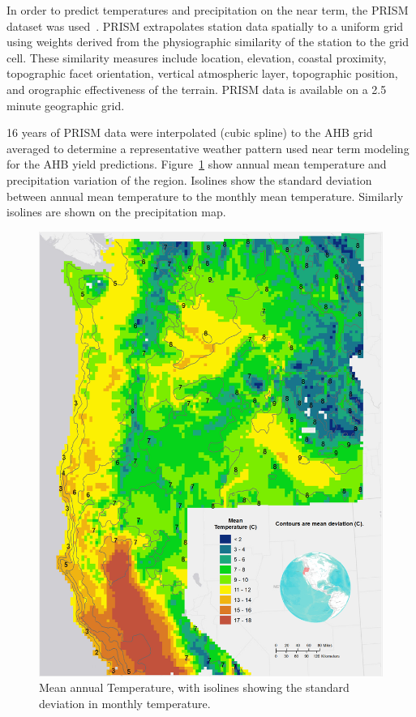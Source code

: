 \documentclass[preprint,12pt]{elsarticle}
\begin{document}
In order to predict temperatures and precipitation on the near term,
the \acf{PRISM} dataset was used~\cite{Daly2008a}.  \ac{PRISM}
extrapolates station data spatially to a uniform grid using weights
derived from the physiographic similarity of the station to the grid
cell. These similarity measures include location, elevation, coastal
proximity, topographic facet orientation, vertical atmospheric layer,
topographic position, and orographic effectiveness of the terrain.
\ac{PRISM} data is available on a 2.5 minute geographic grid.

16 years of \ac{PRISM} data were interpolated (cubic spline) to the
\ac{AHB} grid averaged to determine a representative weather pattern
used near term modeling for the \ac{AHB} yield predictions.
Figure~\ref{fig:temp} show annual mean temperature and precipitation
variation of the region.  Isolines show the standard deviation between
annual mean temperature to the monthly mean temperature.  Similarly
isolines are shown on the precipitation map.

\begin{figure}[hp]
  \centering  
  \includegraphics[width=1\linewidth]{temp}  
\caption{Mean annual Temperature, with isolines showing the standard deviation in monthly temperature.}
  \label{fig:temp}
\end{figure}
\end{document}
